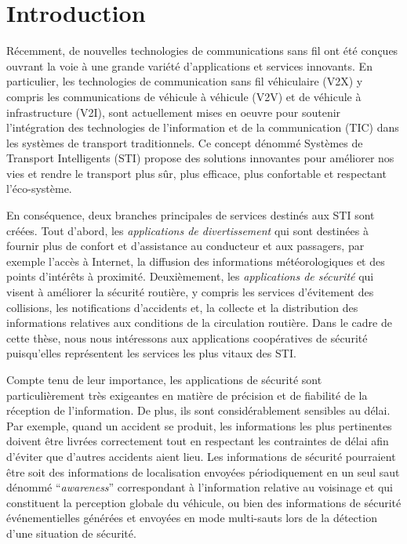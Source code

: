 \section{Introduction}
Récemment, de nouvelles technologies de communications sans fil ont été con\c{c}ues ouvrant la voie à une grande variété d'applications et services innovants. En particulier, les technologies de communication sans fil véhiculaire (V2X) y compris les communications de véhicule à véhicule (V2V) et de véhicule à infrastructure (V2I), sont actuellement mises en oeuvre pour soutenir l'intégration des technologies de l'information et de la communication (TIC) dans les systèmes de transport traditionnels.
Ce concept dénommé Systèmes de Transport Intelligents (STI) propose des solutions innovantes pour améliorer nos vies et rendre le transport plus sûr, plus efficace, plus confortable et respectant l'éco-système.

En conséquence, deux branches principales de services destinés aux STI sont créées. Tout d'abord, les \textit{applications de divertissement} qui sont destinées à fournir plus de confort et d'assistance au conducteur et aux passagers, par exemple l'accès à Internet, la diffusion des informations météorologiques et des points d'intérêts à proximité. Deuxièmement, les \textit{applications de sécurité} qui visent à améliorer la sécurité routière, y compris les services d'évitement des collisions, les notifications d'accidents et, la collecte et la distribution des informations relatives aux conditions de la circulation routière.
Dans le cadre de cette thèse, nous nous intéressons aux applications coopératives de sécurité puisqu'elles représentent les services les plus vitaux des STI.

Compte tenu de leur importance, les applications de sécurité sont particulièrement très exigeantes en matière de précision et de fiabilité de la réception de l'information. De plus, ils sont considérablement sensibles au délai. Par exemple, quand un accident se produit, les informations les plus pertinentes doivent être livrées correctement tout en respectant les contraintes de délai afin d'éviter que d'autres accidents aient lieu.
Les informations de sécurité pourraient être soit des informations de localisation envoyées périodiquement en un seul saut dénommé ``\textit{awareness}'' correspondant à l'information relative au voisinage et qui constituent la perception globale du véhicule, ou bien des informations de sécurité événementielles générées et envoyées en mode multi-sauts lors de la détection d'une situation de sécurité.

